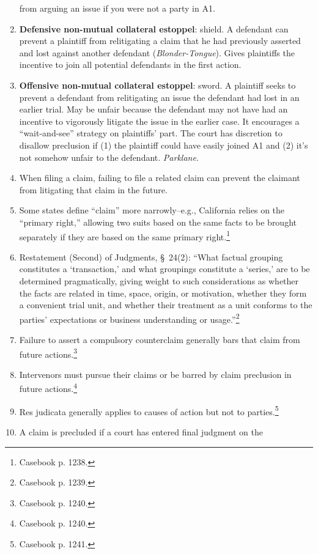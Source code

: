 \begin{enumerate}
    from arguing an issue if you were not a party in A1.
    \item \textbf{Defensive non-mutual collateral estoppel}: shield. A 
    defendant can prevent a plaintiff from relitigating a claim that he had 
    previously asserted and lost against another defendant 
    (\emph{Blonder-Tongue}). Gives plaintiffs the incentive to join all 
    potential defendants in the first action.
    \item \textbf{Offensive non-mutual collateral estoppel}: sword. A 
    plaintiff seeks to prevent a defendant from relitigating an issue the 
    defendant had lost in an earlier trial. May be unfair because the 
    defendant may not have had an incentive to vigorously litigate the issue 
    in the earlier case. It encourages a ``wait-and-see'' strategy on 
    plaintiffs' part. The court has discretion to disallow preclusion if (1) 
    the plaintiff could have easily joined A1 and (2) it's not somehow unfair 
    to the defendant. \emph{Parklane}.
    \item When filing a claim, failing to file a related claim can prevent the 
    claimant from litigating that claim in the future.
    \item Some states define ``claim'' more narrowly--e.g., California relies 
    on the ``primary right,'' allowing two suits based on the same facts to be 
    brought separately if they are based on the same primary 
    right.\footnote{Casebook p. 1238.}
    \item Restatement (Second) of Judgments, \S\ 24(2): ``What factual 
    grouping constitutes a `transaction,' and what groupings constitute a 
    `series,' are to be determined pragmatically, giving weight to such 
    considerations as whether the facts are related in time, space, origin, or 
    motivation, whether they form a convenient trial unit, and whether their 
    treatment as a unit conforms to the parties' expectations or business 
    understanding or usage.''\footnote{Casebook p. 1239.}
    \item Failure to assert a compulsory counterclaim generally bars that 
    claim from future actions.\footnote{Casebook p. 1240.}
    \item Intervenors must pursue their claims or be barred by claim preclusion 
    in future actions.\footnote{Casebook p. 1240.}
    \item Res judicata generally applies to causes of action but not to 
    parties.\footnote{Casebook p. 1241.}
    \item A claim is precluded if a court has entered final judgment on the 

\end{enumerate}
